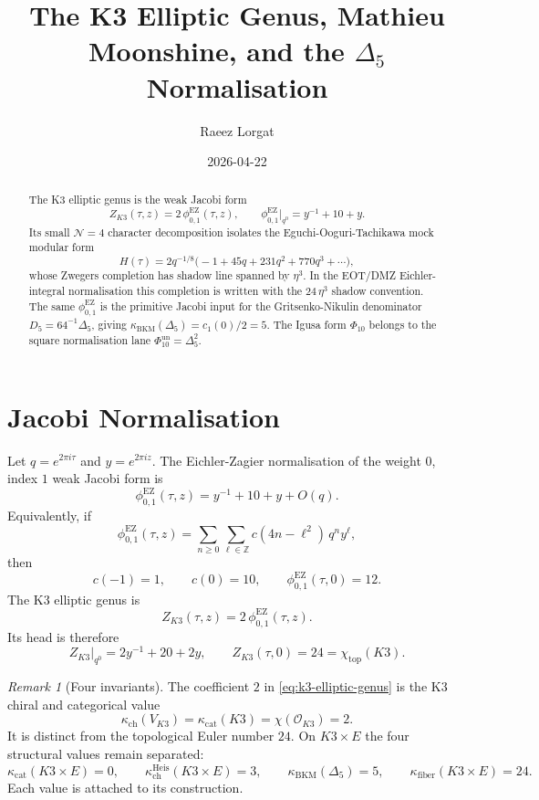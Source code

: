 \documentclass[11pt]{article}
\title{The K3 Elliptic Genus, Mathieu Moonshine, and the \texorpdfstring{$\Delta_5$}{Delta5} Normalisation}
\author{Raeez Lorgat}
\date{2026-04-22}
\theoremstyle{definition}
\theoremstyle{remark}
\newtheorem{remark}[theorem]{Remark}
\newcommand{\ZZ}{\mathbb{Z}}
\newcommand{\cO}{\mathcal{O}}
\newcommand{\phiEZ}{\phi_{0,1}^{\mathrm{EZ}}}
\begin{document}
\maketitle

\begin{abstract}
The K3 elliptic genus is the weak Jacobi form
\[
  Z_{K3}(\tau,z)=2\,\phiEZ(\tau,z),
  \qquad
  \phiEZ\big|_{q^0}=y^{-1}+10+y.
\]
Its small \(\mathcal N=4\) character decomposition isolates the
Eguchi-Ooguri-Tachikawa mock modular form
\[
  H(\tau)=2q^{-1/8}\bigl(-1+45q+231q^2+770q^3+\cdots\bigr),
\]
whose Zwegers completion has shadow line spanned by \(\eta^3\).  In
the EOT/DMZ Eichler-integral normalisation this completion is written
with the \(24\,\eta^3\) shadow convention.
The same \(\phiEZ\) is the primitive Jacobi input for the
Gritsenko-Nikulin denominator \(D_5=64^{-1}\Delta_5\), giving
\(\kappa_{\mathrm{BKM}}(\Delta_5)=c_1(0)/2=5\).  The Igusa form
\(\Phi_{10}\) belongs to the square normalisation lane
\(\Phi_{10}^{\mathrm{un}}=\Delta_5^2\).
\end{abstract}

\tableofcontents

\section{Jacobi Normalisation}
\label{sec:jacobi-normalisation}

Let \(q=e^{2\pi i\tau}\) and \(y=e^{2\pi iz}\).  The Eichler-Zagier
normalisation of the weight \(0\), index \(1\) weak Jacobi form is
\[
  \phiEZ(\tau,z)=y^{-1}+10+y+O(q).
\]
Equivalently, if
\[
  \phiEZ(\tau,z)=\sum_{n\geq 0}\sum_{\ell\in\ZZ}
       c(4n-\ell^2)\,q^n y^\ell,
\]
then
\[
  c(-1)=1,\qquad c(0)=10,\qquad
  \phiEZ(\tau,0)=12.
\]
The K3 elliptic genus is
\begin{equation}
\label{eq:k3-elliptic-genus}
  Z_{K3}(\tau,z)=2\,\phiEZ(\tau,z).
\end{equation}
Its head is therefore
\[
  Z_{K3}\big|_{q^0}=2y^{-1}+20+2y,
  \qquad Z_{K3}(\tau,0)=24=\chi_{\mathrm{top}}(K3).
\]

\begin{remark}[Four invariants]
\label{rem:four-invariants}
The coefficient \(2\) in \eqref{eq:k3-elliptic-genus} is the K3
chiral and categorical value
\[
  \kappa_{\mathrm{ch}}(V_{K3})
  =\kappa_{\mathrm{cat}}(K3)
  =\chi(\cO_{K3})=2.
\]
It is distinct from the topological Euler number \(24\).  On
\(K3\times E\) the four structural values remain separated:
\[
  \kappa_{\mathrm{cat}}(K3\times E)=0,\qquad
  \kappa_{\mathrm{ch}}^{\mathrm{Heis}}(K3\times E)=3,\qquad
  \kappa_{\mathrm{BKM}}(\Delta_5)=5,\qquad
  \kappa_{\mathrm{fiber}}(K3\times E)=24.
\]
Each value is attached to its construction.
\end{remark}
\end{document}
